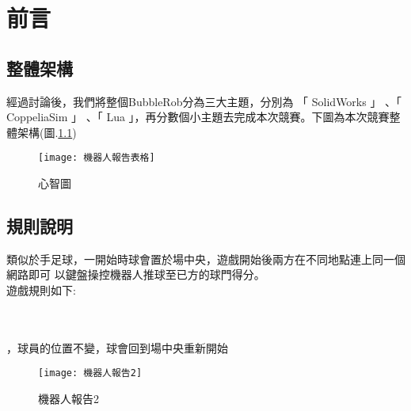 \chapter{前言}
\renewcommand{\baselinestretch}{10.0} %
\setcounter{page}{1}  %
\fontsize{14pt}{2.5pt}\sectionef
\section{整體架構}
    經過討論後，我們將整個BubbleRob分為三大主題，分別為 「 SolidWorks 」 、「 CoppeliaSim 」 、「 Lua 」，再分數個小主題去完成本次競賽。下圖為本次競賽整體架構(圖.\ref{fig.機器人報告表格})\\

\begin{figure}[hbt!]
\begin{center}
\texttt{[image: 機器人報告表格]}
\caption{\Large 心智圖}\label{fig.機器人報告表格}
\end{center}
\end{figure}


\section{規則說明}
類似於手足球，一開始時球會置於場中央，遊戲開始後兩方在不同地點連上同一個網路即可
以鍵盤操控機器人推球至已方的球門得分。\\
 
遊戲規則如下:\\

\begin{itemize}
	\\
	\\
	，球員的位置不變，球會回到場中央重新開始\\
\end{itemize}
\begin{figure}[hbt!]
\begin{center}
\texttt{[image: 機器人報告2]}
\caption{\Large 機器人報告2 }
\label{機器人報告2 }
\end{center}
\end{figure}

\renewcommand{\baselinestretch}{0.5} %